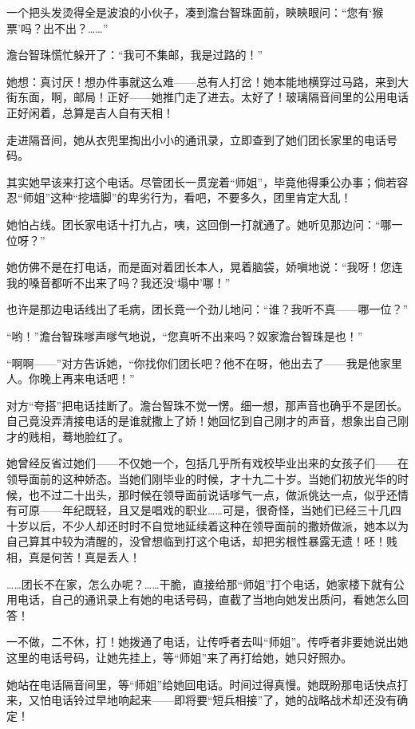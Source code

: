 \par 一个把头发烫得全是波浪的小伙子，凑到澹台智珠面前，鿃鿃眼问：“您有‘猴票’吗？出不出？……”
\par 澹台智珠慌忙躲开了：“我可不集邮，我是过路的！”
\par 她想：真讨厌！想办件事就这么难——总有人打岔！她本能地横穿过马路，来到大街东面，啊，邮局！正好——她推门走了进去。太好了！玻璃隔音间里的公用电话正好闲着，总算是吉人自有天相！
\par 走进隔音间，她从衣兜里掏出小小的通讯录，立即查到了她们团长家里的电话号码。
\par 其实她早该来打这个电话。尽管团长一贯宠着“师姐”，毕竟他得秉公办事；倘若容忍“师姐”这种“挖墙脚”的卑劣行为，看吧，不要多久，团里肯定大乱！
\par 她怕占线。团长家电话十打九占，咦，这回倒一打就通了。她听见那边问：“哪一位呀？”
\par 她仿佛不是在打电话，而是面对着团长本人，晃着脑袋，娇嗔地说：“我呀！您连我的嗓音都听不出来了吗？我还没‘塌中’哪！”
\par 也许是那边电话线出了毛病，团长竟一个劲儿地问：“谁？我听不真——哪一位？”
\par “哟！”澹台智珠嗲声嗲气地说，“您真听不出来吗？奴家澹台智珠是也！”
\par “啊啊——”对方告诉她，“你找你们团长吧？他不在呀，他出去了——我是他家里人。你晚上再来电话吧！”
\par 对方“夸搭”把电话挂断了。澹台智珠不觉一愣。细一想，那声音也确乎不是团长。自己竟没弄清接电话的是谁就撒上了娇！她回忆到自己刚才的声音，想象出自己刚才的贱相，蓦地脸红了。
\par 她曾经反省过她们——不仅她一个，包括几乎所有戏校毕业出来的女孩子们——在领导面前的这种娇态。当她们刚毕业的时候，才十九二十岁。当她们初放光华的时候，也不过二十出头，那时候在领导面前说话嗲气一点，做派佻达一点，似乎还情有可原——年纪既轻，且又是唱戏的职业……可是，很奇怪，当她们已经三十几四十岁以后，不少人却还时时不自觉地延续着这种在领导面前的撒娇做派，她本以为自己算其中较为清醒的，没曾想临到打这个电话，却把劣根性暴露无遗！呸！贱相，真是何苦！真是丢人！
\par ……团长不在家，怎么办呢？……干脆，直接给那“师姐”打个电话，她家楼下就有公用电话，自己的通讯录上有她的电话号码，直截了当地向她发出质问，看她怎么回答！
\par 一不做，二不休，打！她拨通了电话，让传呼者去叫“师姐”。传呼者非要她说出她这里的电话号码，让她先挂上，等“师姐”来了再打给她，她只好照办。
\par 她站在电话隔音间里，等“师姐”给她回电话。时间过得真慢。她既盼那电话快点打来，又怕电话铃过早地响起来——即将要“短兵相接”了，她的战略战术却还没有确定！
